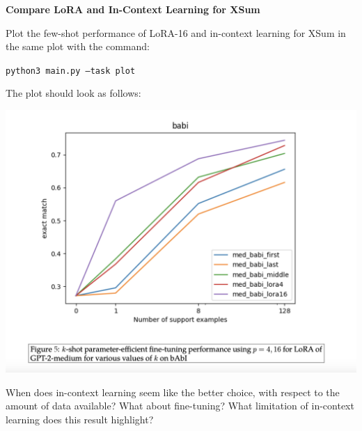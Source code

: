 \item {} {\bf Compare LoRA and In-Context Learning for XSum}

Plot the few-shot performance of LoRA-16 and in-context learning for XSum in the same plot with the command:

{\small\texttt{python3 main.py --task plot}}

The plot should look as follows:
\begin{center}
    \includegraphics[width=0.75\linewidth]{./figures/compare-4a}
\end{center}

When does in-context learning seem like the better choice, with respect to the amount of data available? What about fine-tuning? What limitation of in-context learning does this result highlight?